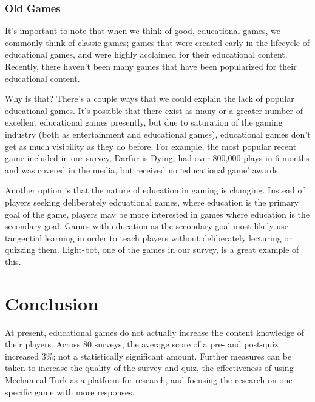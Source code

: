\documentclass[12pt]{report}
\begin{document}
		\subsubsection{Old Games}
			It's important to note that when we think of good, educational games, we commonly think of classic games; games that were created early in the lifecycle of educational games, and were highly acclaimed for their educational content. Recently, there haven't been many games that have been popularized for their educational content.

			Why is that? There's a couple ways that we could explain the lack of popular educational games. It's possible that there exist as many or a greater number of excellent educational games presently, but due to saturation of the gaming industry (both as entertainment and educational games), educational games don't get as much visibility as they do before. For example, the most popular recent game included in our survey, Darfur is Dying, had over 800,000 plays in 6 months and was covered in the media, but received no `educational game' awards.

			Another option is that the nature of education in gaming is changing. Instead of players seeking deliberately edcuational games, where education is the primary goal of the game, players may be more interested in games where education is the secondary goal. Games with education as the secondary goal most likely use tangential learning in order to teach players without deliberately lecturing or quizzing them. Light-bot, one of the games in our survey, is a great example of this.








	


\section{Conclusion}
	At present, educational games do not actually increase the content knowledge of their players. Across 80 surveys, the average score of a pre- and post-quiz increased 3\%; not a statistically significant amount. Further measures can be taken to increase the quality of the survey and quiz, the effectiveness of using Mechanical Turk as a platform for research, and focusing the research on one specific game with more responses.
\end{document}

